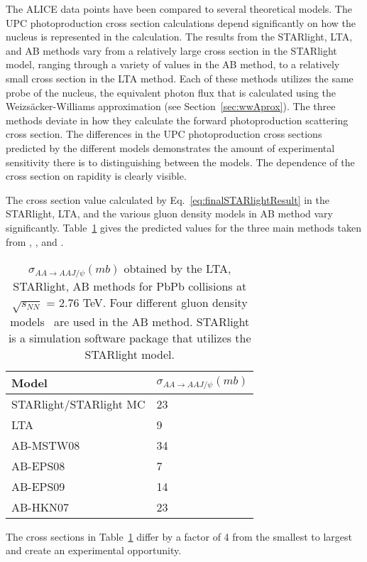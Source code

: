     The ALICE data points have been compared to several theoretical models. 
  The UPC photoproduction cross section calculations depend significantly on 
    how the nucleus is represented in the calculation. 
  The results from the STARlight, LTA, and AB methods vary from a relatively 
    large cross section in the STARlight model, ranging through a variety of values
    in the AB method, to a relatively small cross section in the LTA method. 
  Each of these methods utilizes the same probe of the nucleus, the equivalent 
    photon flux that is calculated using the Weizs\"{a}cker-Williams approximation 
    (see Section~\ref{sec:wwAprox}). 
  The three methods deviate in how they calculate the forward photoproduction
    scattering cross section.
  The differences in the UPC photoproduction cross sections predicted by the 
    different models demonstrates the amount of experimental sensitivity there 
    is to distinguishing between the models. 
  The dependence of the cross section on rapidity is clearly visible.   

  The cross section value calculated by Eq.~\ref{eq:finalSTARlightResult} in the 
    STARlight, LTA, and the various gluon density models in AB method vary 
    significantly.
  Table~\ref{tab:allXsec} gives the predicted values for the three main methods
    taken from \cite{pQCD2013.02}, \cite{lta2011.09}, and \cite{vmd1999}.
  \begin{table} 
   \centering
   \begin{tabular}{|l|l|} 
     \hline
     Model & $\sigma_{AA\rightarrow AAJ/\psi} (mb)$ \\ \hline \hline
     STARlight/STARlight MC & 23 \\ \hline
     LTA & 9 \\ \hline
     AB-MSTW08 & 34 \\ \hline
     AB-EPS08 & 7  \\ \hline
     AB-EPS09 & 14 \\ \hline
     AB-HKN07 & 23 \\ \hline
     \hline
   \end{tabular}
   \caption{$\sigma_{AA\rightarrow AAJ/\psi} (mb)$
   obtained by the LTA, STARlight, AB methods for PbPb collisions at $\sqrt{s_{NN}}$ = 2.76 TeV. 
    Four different gluon density models~\cite{pQCD2011.08,pQCD2013.02,Pumplin:2002vw} are used 
    in the AB method. STARlight is a simulation software package that utilizes 
    the STARlight model.}
   \label{tab:allXsec}
  \end{table}
  The cross sections in Table~\ref{tab:allXsec} differ by a factor of 4 
    from the smallest to largest and create an experimental opportunity. 

